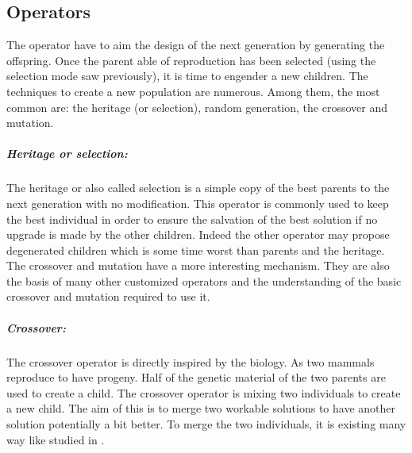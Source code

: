 %	
\subsection{Operators }


The operator have to aim the design of the next generation by generating the offspring. 
Once the parent able of reproduction has been selected (using the selection mode saw previously), it is time to engender a new children.
The techniques to create a new population are numerous. Among them, the most common  are: the heritage (or selection), random generation, the crossover and mutation. 

\subparagraph{Heritage or selection:}
The heritage or also called selection is a simple copy of the best parents to the next generation with no modification. This operator is commonly used to keep the best individual in order to ensure the salvation of the best solution if no upgrade is made by the other children. Indeed the other operator may propose degenerated children which is some time worst than parents and the heritage.
\\
The crossover and mutation have a more interesting mechanism. They are also the basis of many other customized operators and the understanding of the basic crossover and mutation required to use it.
 
 
\subparagraph{Crossover:} 

The crossover operator is directly inspired by the biology. As two mammals reproduce to have progeny. Half of the genetic material of the two parents are used to create a child.
The crossover operator is mixing two individuals to create a new child. The aim of this is to merge two workable solutions to have  another solution potentially a bit better. To merge the two individuals, it is existing many way like studied in \cite{113*mais2010}.
  

